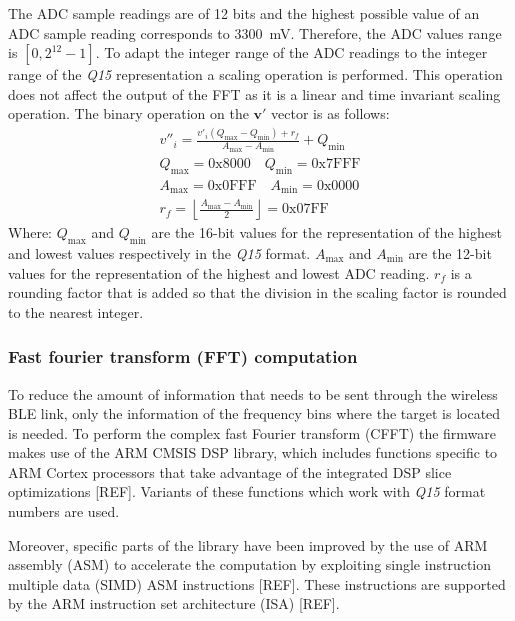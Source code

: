 The ADC sample readings are of 12 bits and the highest possible value of an ADC sample reading corresponds to \SI{3300}{\milli\volt}. Therefore, the ADC values range is $[0, 2^{12}-1]$. To adapt the integer range of the ADC readings to the integer range of the \textit{Q15} representation a scaling operation is performed. This operation does not affect the output of the FFT as it is a linear and time invariant scaling operation. The binary operation on the $\mathbf{v'}$ vector is as follows:
\begin{gather}
	v''_i = \frac{v'_i(Q_{\max}-Q_{\min})+r_f}{A_{\max}-A_{\min}} + Q_{\min}\\
	Q_{\max} = \mathrm{0x8000}\quad Q_{\min} = \mathrm{0x7FFF} \\
	A_{\max} = \mathrm{0x0FFF}\quad A_{\min} = \mathrm{0x0000} \\
	r_f = \left\lfloor \frac{A_{\max}-A_{\min}}{2} \right\rfloor = \mathrm{0x07FF}
\end{gather}
Where: $Q_{\max}$ and $Q_{\min}$ are the 16-bit values for the representation of the highest and lowest values respectively in the \textit{Q15} format. $A_{\max}$ and $A_{\min}$ are the 12-bit values for the representation of the highest and lowest ADC reading. $r_f$ is a rounding factor that is added so that the division in the scaling factor is rounded to the nearest integer.

\subsubsection{Fast fourier transform (FFT) computation}

To reduce the amount of information that needs to be sent through the wireless BLE link, only the information of the frequency bins where the target is located is needed. To perform the complex fast Fourier transform (CFFT) the firmware makes use of the ARM CMSIS DSP library, which includes functions specific to ARM Cortex processors that take advantage of the integrated DSP slice optimizations [REF]. Variants of these functions which work with \textit{Q15} format numbers are used.

Moreover, specific parts of the library have been improved by the use of ARM assembly (ASM) to accelerate the computation by exploiting single instruction multiple data (SIMD) ASM instructions [REF]. These instructions are supported by the ARM instruction set architecture (ISA) [REF].


